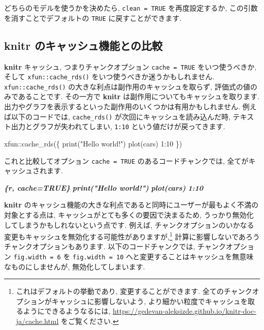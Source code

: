 \documentclass[
  11pt,
]{bxjsreport}
\newenvironment{Shaded}{\begin{snugshade}}{\end{snugshade}}
\newcommand{\DecValTok}[1]{\textcolor[rgb]{0.00,0.00,0.81}{#1}}
\newcommand{\FunctionTok}[1]{\textcolor[rgb]{0.00,0.00,0.00}{#1}}
\newcommand{\InformationTok}[1]{\textcolor[rgb]{0.56,0.35,0.01}{\textbf{\textit{#1}}}}
\newcommand{\NormalTok}[1]{#1}
\newcommand{\SpecialCharTok}[1]{\textcolor[rgb]{0.00,0.00,0.00}{#1}}
\newcommand{\StringTok}[1]{\textcolor[rgb]{0.31,0.60,0.02}{#1}}
\begin{document}
どちらのモデルを使うかを決めたら, \texttt{clean = TRUE} を再度設定するか, この引数を消すことでデフォルトの \texttt{TRUE} に戻すことができます.

\hypertarget{knitr-ux306eux30adux30e3ux30c3ux30b7ux30e5ux6a5fux80fdux3068ux306eux6bd4ux8f03}{%
\subsection{\texorpdfstring{\textbf{knitr} のキャッシュ機能との比較}{knitr のキャッシュ機能との比較}}\label{knitr-ux306eux30adux30e3ux30c3ux30b7ux30e5ux6a5fux80fdux3068ux306eux6bd4ux8f03}}

\textbf{knitr} キャッシュ, つまりチャンクオプション \texttt{cache = TRUE} をいつ使うべきか, そして \texttt{xfun::cache\_rds()} をいつ使うべきか迷うかもしれません. \texttt{xfun::cache\_rds()} の大きな利点は副作用のキャッシュを取らず, 評価式の値のみであることです. その一方で \textbf{knitr} は副作用についてもキャッシュを取ります. 出力やグラフを表示するといった副作用のいくつかは有用かもしれません. 例えば以下のコードでは, \texttt{cache\_rds()} が次回にキャッシュを読み込んだ時, テキスト出力とグラフが失われてしまい, \texttt{1:10} という値だけが戻ってきます.

\begin{Shaded}
\begin{Highlighting}[numbers=left,,]
\NormalTok{xfun}\SpecialCharTok{::}\FunctionTok{cache\_rds}\NormalTok{(\{}
  \FunctionTok{print}\NormalTok{(}\StringTok{"Hello world!"}\NormalTok{)}
  \FunctionTok{plot}\NormalTok{(cars)}
  \DecValTok{1}\SpecialCharTok{:}\DecValTok{10}
\NormalTok{\})}
\end{Highlighting}
\end{Shaded}

これと比較してオプション \texttt{cache = TRUE} のあるコードチャンクでは, 全てがキャッシュされます.

\begin{Shaded}
\begin{Highlighting}[]
\InformationTok{\textasciigrave{}\textasciigrave{}\textasciigrave{}\{r, cache=TRUE\}}
\InformationTok{print("Hello world!")}
\InformationTok{plot(cars)}
\InformationTok{1:10}
\InformationTok{\textasciigrave{}\textasciigrave{}\textasciigrave{}}
\end{Highlighting}
\end{Shaded}

\textbf{knitr} のキャッシュ機能の大きな利点であると同時にユーザーが最もよく不満の対象とする点は, キャッシュがとても多くの要因で決まるため, うっかり無効化してしまうかもしれないという点です. 例えば, チャンクオプションのいかなる変更もキャッシュを無効化する可能性がありますが,\footnote{これはデフォルトの挙動であり, 変更することができます. 全てのチャンクオプションがキャッシュに影響しないよう, より細かい粒度でキャッシュを取るようにできるようなるには, \url{https://gedevan-aleksizde.github.io/knitr-doc-ja/cache.html} をご覧ください.} 計算に影響しないであろうチャンクオプションもあります. 以下のコードチャンクでは, チャンクオプション \texttt{fig.width = 6} を \texttt{fig.width = 10} へと変更することはキャッシュを無意味なものにしませんが, 無効化してしまいます.
\end{document}
